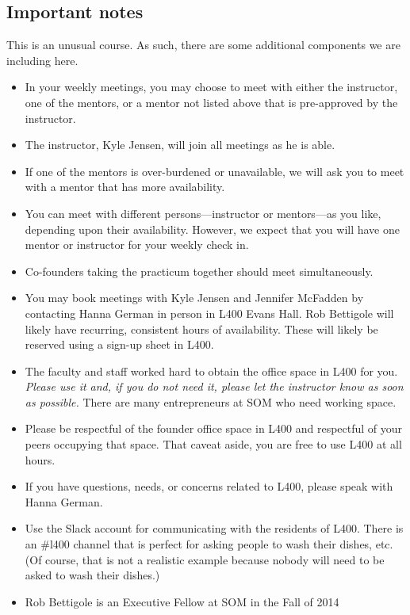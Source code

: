 \subsection*{Important notes}

This is an unusual course. As such, there are some additional components
we are including here.

\begin{itemize}
	\item In your weekly meetings, you may choose to meet with either
		the instructor, one of the mentors, or a mentor not listed above
		that is pre-approved by the instructor.
	\item The instructor, Kyle Jensen, will join all meetings as he is able.
	\item If one of the mentors is over-burdened or unavailable, we will
		ask you to meet with a mentor that has more availability.
	\item You can meet with different persons---instructor or mentors---as
		you like, depending upon their availability. However, we expect that you will have one mentor or instructor for your weekly check in. 
	\item Co-founders taking the practicum together should meet simultaneously.
	\item You may book meetings with Kyle Jensen and Jennifer McFadden
		by contacting Hanna German in person in L400 Evans Hall. Rob
		Bettigole will likely have recurring, consistent hours of availability.
		These will likely be reserved using a sign-up sheet in L400.
	\item The faculty and staff worked hard to obtain the office space
		in L400 for you. \emph{Please use it and, if you do not need
		it, please let the instructor know as soon as possible.}
		There are many entrepreneurs at SOM who need working space.
	\item Please be respectful of the founder office space in L400 and
		respectful of your peers occupying that space. That caveat aside,
		you are free to use L400 at all hours.
	\item If you have questions, needs, or concerns
		related to L400, please speak with Hanna German.
	\item Use the Slack account for communicating with the residents of
		L400. There is an \#l400 channel that is perfect for asking people
		to wash their dishes, etc. (Of course, that is not a realistic
		example because nobody will need to be
		asked to wash their dishes.)
	\item Rob Bettigole is an Executive Fellow at SOM in the Fall of 2014

\end{itemize}
